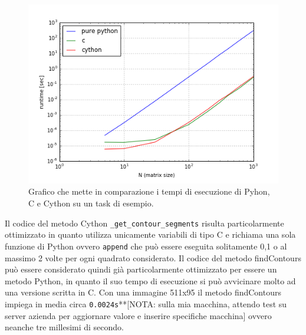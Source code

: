 \documentclass[12pt,a4paper]{report}
\begin{document}
\begin{figure}[H]
    \centering
    \includegraphics[scale=0.9]{img/cython-vs-c.png}
    \caption{Grafico che mette in comparazione i tempi di esecuzione di Pyhon, C e Cython su un task di esempio. 
}
\end{figure} \newpage
Il codice del metodo Cython \verb|_get_contour_segments| risulta particolarmente ottimizzato in quanto utilizza unicamente variabili di tipo C e richiama una sola funzione di Python ovvero \verb|append| che può essere eseguita solitamente 0,1 o al massimo 2 volte per ogni quadrato considerato. 
Il codice del metodo findContours può essere considerato quindi già particolarmente ottimizzato per essere un metodo Python, in quanto il suo tempo di esecuzione si può avvicinare molto ad una versione scritta in C. \newline
Con una immagine 511x95 il metodo findContours impiega in media circa \verb|0.0024s|**[NOTA: sulla mia macchina,  attendo test su server azienda per aggiornare valore e inserire specifiche macchina] %
ovvero neanche tre millesimi di secondo.
\end{document}
